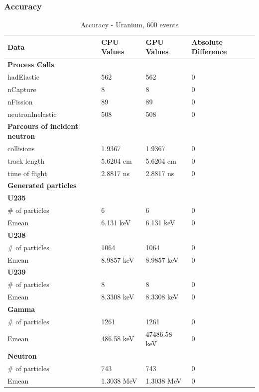 \documentclass[12pt]{article}
\begin{document}
	\subsubsection{Accuracy}
		\begin{table}[H]
		\centering
		\caption{Accuracy - Uranium, 600 events}\label{sys4Acc}
		\begin{tabular}{lp{2.3cm}p{2.3cm}l}
		\toprule
		\bf Data & CPU Values & GPU Values & Absolute Difference\\\midrule
		\bf Process Calls&&&\\
		hadElastic&562&562&0\\
		nCapture&8&8&0\\
		nFission&89&89&0\\
		neutronInelastic&508&508&0\\ 

		\midrule
		\bf Parcours of incident neutron&&&\\
		collisions&1.9367&1.9367&0\\
		track length&5.6204 cm&5.6204 cm&0\\
		time of flight&2.8817 ns&2.8817 ns&0\\

		\midrule
		\bf Generated particles&&&\\
		
		\bf{U235}&&&\\
		\# of particles&6&6&0\\
		Emean&6.131 keV&6.131 keV&0\\
		
		\bf{U238}&&&\\
		\# of particles&1064&1064&0\\
		Emean&8.9857 keV&8.9857 keV&0\\
		
		\bf{U239}&&&\\
		\# of particles&8&8&0\\
		Emean&8.3308 keV&8.3308 keV&0\\
		
		\bf{Gamma}&&&\\
		\# of particles&1261&1261&0\\
		Emean&486.58 keV&47486.58 keV&0\\
		
		\bf{Neutron}&&&\\
		\# of particles&743&743&0\\
		Emean&1.3038 MeV&1.3038 MeV&0\\\bottomrule
		\end{tabular}
		\end{table}
		\break
\end{document}
